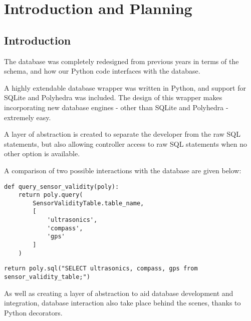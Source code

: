 \section{Introduction and Planning}

\subsection{Introduction}
The database was completely redesigned from previous years in terms of the schema, and how our Python code interfaces with the database.

A highly extendable database wrapper was written in Python, and support for SQLite and Polyhedra was included. The design of this wrapper makes incorporating new database engines - other than SQLite and Polyhedra - extremely easy.

A layer of abstraction is created to separate the developer from the raw SQL statements, but also allowing controller access to raw SQL statements when no other option is available.

A comparison of two possible interactions with the database are given below:

\begin{lstlisting}
def query_sensor_validity(poly):
    return poly.query(
        SensorValidityTable.table_name,
        [
            'ultrasonics',
            'compass',
            'gps'
        ]
    )
\end{lstlisting}

\begin{lstlisting}
return poly.sql("SELECT ultrasonics, compass, gps from sensor_validity_table;")
\end{lstlisting}

As well as creating a layer of abstraction to aid database development and integration, database interaction also take place behind the scenes, thanks to Python decorators.


